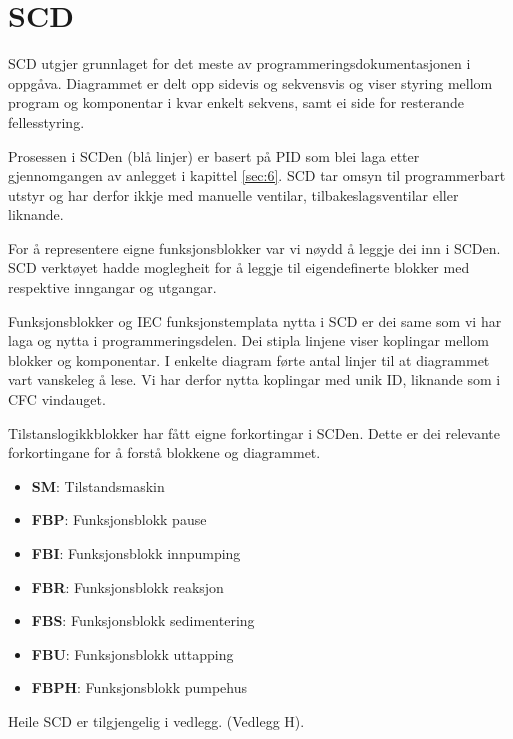 \newpage
\section{SCD}
\thispagestyle{fancy}

\gls{SCD} utgjer grunnlaget for det meste av programmeringsdokumentasjonen i oppgåva.
Diagrammet er delt opp sidevis og sekvensvis og viser styring mellom program og komponentar i kvar enkelt sekvens,
samt ei side for resterande fellesstyring.

Prosessen i \gls{SCD}en (blå linjer) er basert på \gls{PID} som blei laga etter gjennomgangen av anlegget i kapittel \ref{sec:6}.
\gls{SCD} tar omsyn til programmerbart utstyr og har derfor ikkje med manuelle ventilar, tilbakeslagsventilar eller liknande.

For å representere eigne funksjonsblokker var vi nøydd å leggje dei inn i \gls{SCD}en.
\gls{SCD} verktøyet hadde moglegheit for å leggje til eigendefinerte blokker med respektive inngangar og utgangar.

Funksjonsblokker og \gls{IEC} funksjonstemplata nytta i \gls{SCD} er dei same som vi har laga og nytta i programmeringsdelen. 
Dei stipla linjene viser koplingar mellom blokker og komponentar. \newline
I enkelte diagram førte antal linjer til at diagrammet vart vanskeleg å lese. 
Vi har derfor nytta koplingar med unik ID, liknande som i CFC vindauget.

Tilstanslogikkblokker har fått eigne forkortingar i \gls{SCD}en.
Dette er dei relevante forkortingane for å forstå blokkene og diagrammet.

\begin{itemize}
    \item \textbf{SM}:   Tilstandsmaskin
    \item \textbf{FBP}:  Funksjonsblokk pause
    \item \textbf{FBI}:  Funksjonsblokk innpumping
    \item \textbf{FBR}:  Funksjonsblokk reaksjon
    \item \textbf{FBS}:  Funksjonsblokk sedimentering
    \item \textbf{FBU}:  Funksjonsblokk uttapping
    \item \textbf{FBPH}: Funksjonsblokk pumpehus
\end{itemize}

Heile \gls{SCD} er tilgjengelig i vedlegg. (Vedlegg H). \newline
\newpage

